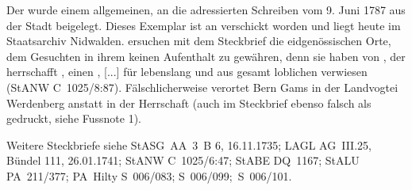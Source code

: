 \documentclass[10pt,twoside]{article}
\begin{document}
\def\volume{XIV. Abteilung: Die Rechtsquellen des Kantons St. Gallen, Dritter Teil: Die Landschaften und Landstädte, Band 4: Die Rechtsquellen der
     Region Werdenberg: Grafschaft Werdenberg und Herrschaft Wartau, Freiherrschaft Sax-Forstegg und Herrschaft Hohensax-Gams von Sibylle Malamud, 2019.}
\def\volid{\url{https://www.ssrq-sds-fds.ch/online/tei/SG/SSRQ_SG_III_4_253.xml}}
\linenumbers				%
\normalsize					%
\thispagestyle{firstpage}
\sloppy
\setcounter{subsection}{252}  %
\fussy
{}
\begin{introlist}

         \item {Der  wurde einem allgemeinen, an die  adressierten Schreiben vom 9. Juni 1787 aus der Stadt  beigelegt. Dieses Exemplar ist an  verschickt worden und liegt heute im
               Staatsarchiv Nidwalden.  ersuchen mit dem Steckbrief die eidgenössischen Orte, dem Gesuchten
               in ihrem  keinen Aufenthalt zu gewähren, denn sie
               haben  von , \textup{der herrschafft , einen ,
                  [...] für lebenslang  und aus
                  gesamt loblichen
                   verwiesen}
                     (StANW C 1025/8:87). Fälschlicherweise verortet
               Bern Gams in der Landvogtei Werdenberg anstatt in der Herrschaft  (auch im Steckbrief ebenso falsch als
                  \textup{} gedruckt, siehe Fussnote 1). 


}
         \item {Weitere Steckbriefe siehe StASG AA 3 B 6, 16.11.1735; LAGL AG III.25, Bündel 111, 26.01.1741; StANW C 1025/6:47; StABE DQ 1167; StALU PA 211/377;
            PA Hilty S 006/083; S 006/099; S 006/101.


}
      
\end{introlist}
\end{document}
